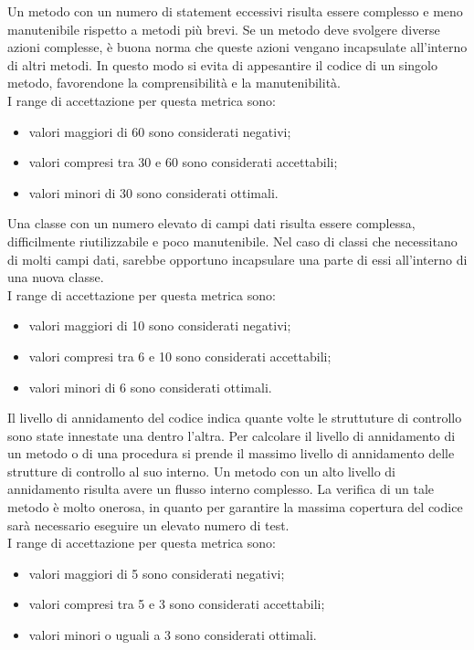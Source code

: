 			Un metodo con un numero di statement eccessivi risulta essere complesso e meno manutenibile rispetto a metodi più brevi. Se un metodo deve svolgere diverse azioni complesse, è buona norma che queste azioni vengano incapsulate all'interno di altri metodi. In questo modo si evita di appesantire il codice di un singolo metodo, favorendone la comprensibilità e la manutenibilità.\\
			I range di accettazione per questa metrica sono:
				\begin{itemize}
					\item valori maggiori di 60 sono considerati negativi;
					\item valori compresi tra 30 e 60 sono considerati accettabili;
					\item valori minori di 30 sono considerati ottimali.
				\end{itemize}
			Una classe con un numero elevato di campi dati risulta essere complessa, difficilmente riutilizzabile e poco manutenibile. Nel caso di classi che necessitano di molti campi dati, sarebbe opportuno incapsulare una parte di essi all'interno di una nuova classe.\\
			I range di accettazione per questa metrica sono:
				\begin{itemize}
					\item valori maggiori di 10 sono considerati negativi;
					\item valori compresi tra 6 e 10 sono considerati accettabili;
					\item valori minori di 6 sono considerati ottimali.
				\end{itemize}
			Il livello di annidamento del codice indica quante volte le struttuture di controllo sono state innestate una dentro l'altra. Per calcolare il livello di annidamento di un metodo o di una procedura si prende il massimo livello di annidamento delle strutture di controllo al suo interno. Un metodo con un alto livello di annidamento risulta avere un flusso interno complesso. La verifica di un tale metodo è molto onerosa, in quanto per garantire la massima copertura del codice sarà necessario eseguire un elevato numero di test.\\
			I range di accettazione per questa metrica sono:
			\begin{itemize}
				\item valori maggiori di 5 sono considerati negativi;
				\item valori compresi tra 5 e 3 sono considerati accettabili;
				\item valori minori o uguali a 3 sono considerati ottimali.
			\end{itemize}
